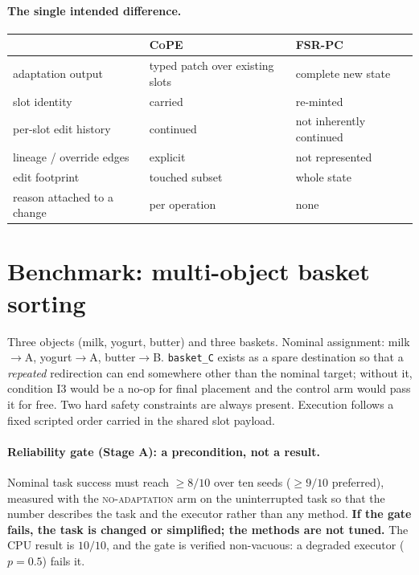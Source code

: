 \documentclass[11pt]{article}
\newcommand{\cope}{\textsc{CoPE}}
\newcommand{\fsrpc}{\textsc{FSR-PC}}
\newcommand{\noadapt}{\textsc{no-adaptation}}
\begin{document}
\paragraph{The single intended difference.}
\begin{center}
\begin{tabular}{@{}lll@{}}
\toprule
 & \cope{} & \fsrpc{}\\
\midrule
adaptation output & typed patch over existing slots & complete new state\\
slot identity & carried & re-minted\\
per-slot edit history & continued & not inherently continued\\
lineage / override edges & explicit & not represented\\
edit footprint & touched subset & whole state\\
reason attached to a change & per operation & none\\
\bottomrule
\end{tabular}
\end{center}

\section{Benchmark: multi-object basket sorting}

Three objects (milk, yogurt, butter) and three baskets. Nominal assignment:
milk$\to$A, yogurt$\to$A, butter$\to$B. \texttt{basket\_C} exists as a spare
destination so that a \emph{repeated} redirection can end somewhere other than
the nominal target; without it, condition I3 would be a no-op for final
placement and the control arm would pass it for free. Two hard safety
constraints are always present. Execution follows a fixed scripted order carried
in the shared slot payload.

\paragraph{Reliability gate (Stage A): a precondition, not a result.}
Nominal task success must reach $\geq 8/10$ over ten seeds ($\geq 9/10$
preferred), measured with the \noadapt{} arm on the uninterrupted task so that
the number describes the task and the executor rather than any method.
\textbf{If the gate fails, the task is changed or simplified; the methods are
not tuned.} The CPU result is $10/10$, and the gate is verified non-vacuous: a
degraded executor ($p=0.5$) fails it.
\end{document}

